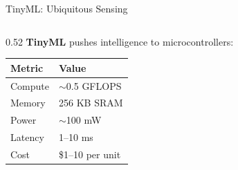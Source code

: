 \documentclass[aspectratio=169, 12pt]{beamer}
\begin{document}
\begin{frame}{TinyML: Ubiquitous Sensing}
\note{
%
%
%
%
%
}

\small
\begin{columns}[T]
  \begin{column}{0.52\textwidth}
    \textbf{TinyML} pushes intelligence to microcontrollers:

    \vspace{0.15cm}
    {\footnotesize
    \renewcommand{\arraystretch}{1.15}
    \begin{tabular}{@{}ll@{}}
      \toprule
      \textbf{Metric} & \textbf{Value} \\
      \midrule
      Compute    & $\sim$0.5 GFLOPS \\
      Memory     & 256 KB SRAM \\
      Power      & $\sim$100 mW \\
      Latency    & 1--10 ms \\
      Cost       & \$1--10 per unit \\
      \bottomrule
    \end{tabular}
    }


\end{column}
\end{columns}
\end{frame}
\end{document}
